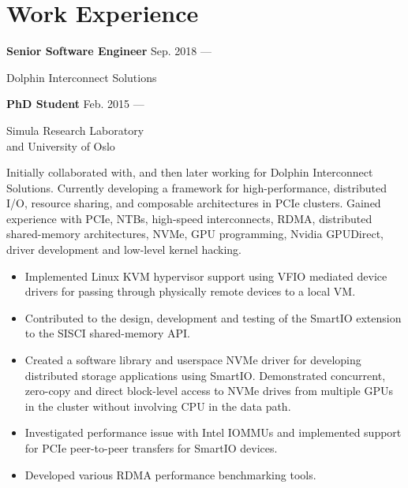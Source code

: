 \section{Work Experience}
\parbox[t][][t]{\linewidth}{
	\parbox{\linewidth}{\textbf{Senior Software Engineer}
		\hfill {{Sep. 2018 --- \phantom{Jun. 2019}}}}
		\smallbreak
	\parbox{\linewidth}{Dolphin Interconnect Solutions}
	\smallbreak
	\parbox{\linewidth}{\textbf{PhD Student}
		\hfill {{Feb. 2015 --- \phantom{Jun. 2019}}}}
		\smallbreak
	\parbox{\linewidth}{Simula Research Laboratory\\and University of Oslo}
	
	\bigskip
	Initially collaborated with, and then later working for Dolphin Interconnect Solutions.
	Currently developing a framework for high-performance, distributed I/O, resource sharing,
	and composable architectures in PCIe clusters.
	Gained experience with PCIe, NTBs, high-speed interconnects, RDMA, distributed shared-memory
	architectures, NVMe, GPU programming, Nvidia GPUDirect, driver development and low-level kernel hacking.

	\bigskip
	\begin{itemize}
		\item{Implemented Linux KVM hypervisor support using VFIO mediated device drivers
			for passing through physically remote devices to a local VM.}\\[-.6em]
		\item{Contributed to the design, development and testing of the SmartIO
			extension to the SISCI shared-memory API.}\\[-.6em]
		\item{Created a software library and userspace NVMe driver 
			for developing distributed storage applications using SmartIO.
			Demonstrated concurrent, zero-copy and direct block-level access to NVMe drives from
			multiple GPUs in the cluster without involving CPU in the data path.}\\[-.6em]
		\item{Investigated performance issue with Intel IOMMUs and
			implemented support for PCIe peer-to-peer transfers for SmartIO devices.}\\[-.6em]
		\item{Developed various RDMA performance benchmarking tools.}
	\end{itemize}
	\bigskip
	\bigskip
}

